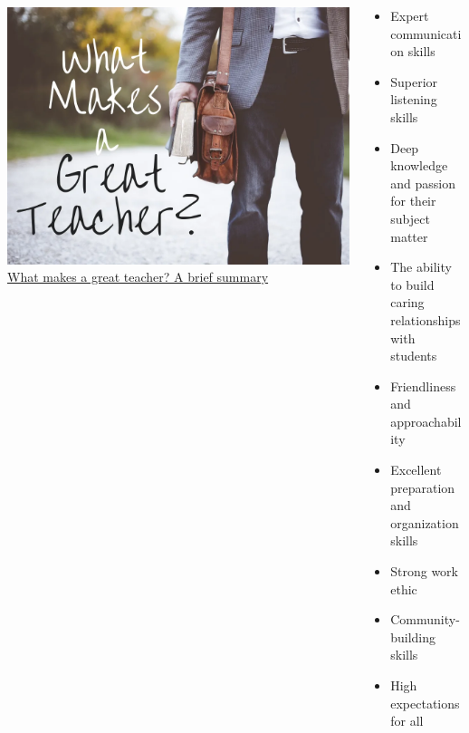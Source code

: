 \documentclass[
  ignorenonframetext,
]{beamer}
\providecommand{\tightlist}{%
  \setlength{\itemsep}{0pt}\setlength{\parskip}{0pt}}\usepackage{longtable,booktabs,array}
\begin{document}
\begin{frame}{}
\protect\hypertarget{section-5}{}
\begin{columns}[T]
\begin{column}{0.3\textwidth}
\includegraphics{images/gr8_teacher.webp}\href{https://owlcation.com/academia/Characteristics-Of-A-Good-Teacher}{What
makes a great teacher? A brief summary}
\end{column}

\begin{column}{0.7\textwidth}
\begin{itemize}[<+->]
\tightlist
\item
  Expert communication skills
\item
  Superior listening skills
\item
  Deep knowledge and passion for their subject matter
\item
  The ability to build caring relationships with students
\item
  Friendliness and approachability
\item
  Excellent preparation and organization skills
\item
  Strong work ethic
\item
  Community-building skills
\item
  High expectations for all
\end{itemize}
\end{column}
\end{columns}
\end{frame}
\end{document}
